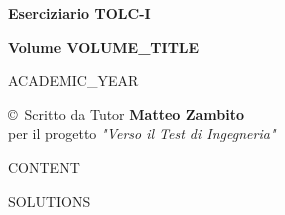 \documentclass[20pt, a4paper]{article}
\begin{document}
\begin{titlepage}
    \centering
    \vspace*{2cm}
    {\Huge \textbf{Eserciziario TOLC-I} \par}
    \vspace{1cm}
    {\Large \textbf{Volume {{VOLUME_TITLE}}} \par}
    \vspace{4cm}
    {\Large {{ACADEMIC_YEAR}} \par}
    \vspace{4cm}
    \vfill
    {\large \copyright \ Scritto da Tutor \textbf{Matteo Zambito} \\
    per il progetto \textit{"Verso il Test di Ingegneria"} \par}
\end{titlepage}

\newpage
\tableofcontents
\newpage

{{CONTENT}}

\newpage
{{SOLUTIONS}}
\end{document}
